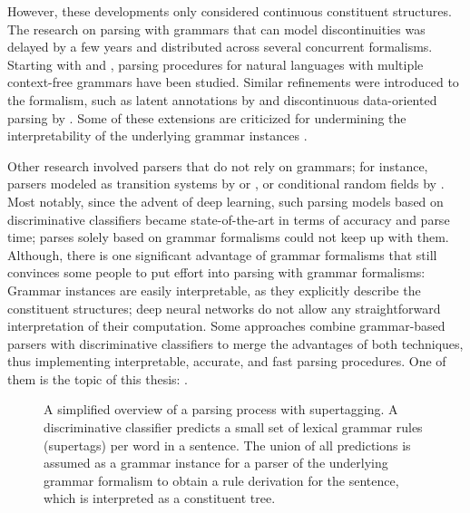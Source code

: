\documentclass[../document.tex]{subfiles}
\begin{document}
    However, these developments only considered continuous constituent structures.
    The research on parsing with grammars that can model discontinuities was delayed by a few years and distributed across several concurrent formalisms.
    Starting with \citet{MaierSogaard08} and \citet{Kal10}, parsing procedures for natural languages with multiple context-free grammars have been studied.
    Similar refinements were introduced to the formalism, such as latent annotations by \citet{Geb20} and discontinuous data-oriented parsing by \citet{Cra11}.
    Some of these extensions are criticized for undermining the interpretability of the underlying grammar instances \citep[Chapter 9]{Geb20}.

    Other research involved parsers that do not rely on grammars; for instance, parsers modeled as transition systems by \citet{Verseley14} or \citet{CoaCoh19}, or conditional random fields by \citet{Petrov08}.
    Most notably, since the advent of deep learning, such parsing models based on discriminative classifiers became state-of-the-art in terms of accuracy and parse time; parses solely based on grammar formalisms could not keep up with them.
    Although, there is one significant advantage of grammar formalisms that still convinces some people to put effort into parsing with grammar formalisms:
        Grammar instances are easily interpretable, as they explicitly describe the constituent structures; deep neural networks do not allow any straightforward interpretation of their computation.
    Some approaches combine grammar-based parsers with discriminative classifiers to merge the advantages of both techniques, thus implementing interpretable, accurate, and fast parsing procedures.
    One of them is the topic of this thesis: .

    \begin{figure}
        \resizebox{\linewidth}{!}{}
        \caption{\label{fig:supertagging}
            A simplified overview of a parsing process with supertagging.
            A discriminative classifier predicts a small set of lexical grammar rules (supertags) per word in a sentence.
            The union of all predictions is assumed as a grammar instance for a parser of the underlying grammar formalism to obtain a rule derivation for the sentence, which is interpreted as a constituent tree.
        }
    \end{figure}
\end{document}
